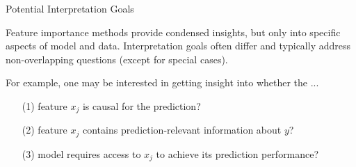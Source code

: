 \documentclass[11pt,compress,t,notes=noshow, aspectratio=169, xcolor=table]{beamer}
\begin{document}
\begin{frame}{Potential Interpretation Goals}

Feature importance methods provide condensed insights, but only into specific aspects of model and data. Interpretation goals often differ and typically address non-overlapping questions (except for special cases).

\lz 

For example, one may be interested in getting insight into whether the ...

\begin{enumerate}
    \item[(1)] feature $x_j$ is causal for the prediction?
    \item[(2)] feature $x_j$ contains prediction-relevant information about $y$?
    \item[(3)] model requires access to $x_j$ to achieve its prediction performance?
\end{enumerate}
\end{frame}
\end{document}
